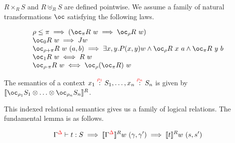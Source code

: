 $R \times_R S$ and $R \uplus_R S$ are defined pointwise.
We assume a family of natural transformations $\oc$ satisfying the following laws.

\begin{displaymath}
  \begin{array}{l}
    \rho \leq \pi \implies (\oc_\pi R\ w \implies \oc_\rho R\ w) \\
    \oc_0 R\ w \implies J w \\
    \oc_{\rho+\pi} R\ w\ (a, b) \implies \exists x,y. P(x,y)w \wedge \oc_\rho R\ x\ a \wedge \oc_\pi R\ y\ b \\
    \oc_1 R\ w \iff R\ w \\
    \oc_{\rho \cdot \pi} R\ w \iff \oc_\rho(\oc_\pi R)\ w
  \end{array}
\end{displaymath}

The semantics of a context $\ctxvar{x_1}{S_1}{\rho_1}, \ldots, \ctxvar{x_n}{S_n}{\rho_n}$ is given by $\tensor{\llbracket \excl{\rho_1}{S_1}}{\tensor{\ldots}{\excl{\rho_n}{S_n}}} \rrbracket^R$.

This indexed relational semantics gives us a family of logical relations.
The fundamental lemma is as follows.

\begin{displaymath}
  \ctx{\Gamma}{\Delta} \vdash t : S \implies \llbracket \ctx{\Gamma}{\Delta} \rrbracket^R w\ (\gamma, \gamma') \implies \llbracket t \rrbracket^R w\ (s, s')
\end{displaymath}


